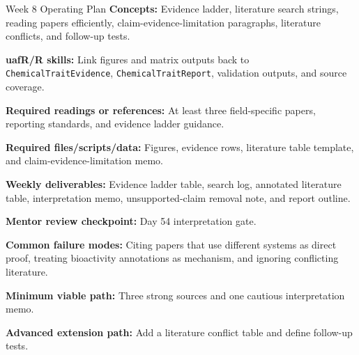 \begin{checklistbox}{Week 8 Operating Plan}
\textbf{Concepts:} Evidence ladder, literature search strings, reading papers efficiently, claim-evidence-limitation paragraphs, literature conflicts, and follow-up tests.

\textbf{uafR/R skills:} Link figures and matrix outputs back to \texttt{ChemicalTraitEvidence}, \texttt{ChemicalTraitReport}, validation outputs, and source coverage.

\textbf{Required readings or references:} At least three field-specific papers, reporting standards, and evidence ladder guidance.

\textbf{Required files/scripts/data:} Figures, evidence rows, literature table template, and claim-evidence-limitation memo.

\textbf{Weekly deliverables:} Evidence ladder table, search log, annotated literature table, interpretation memo, unsupported-claim removal note, and report outline.

\textbf{Mentor review checkpoint:} Day 54 interpretation gate.

\textbf{Common failure modes:} Citing papers that use different systems as direct proof, treating bioactivity annotations as mechanism, and ignoring conflicting literature.

\textbf{Minimum viable path:} Three strong sources and one cautious interpretation memo.

\textbf{Advanced extension path:} Add a literature conflict table and define follow-up tests.
\end{checklistbox}

